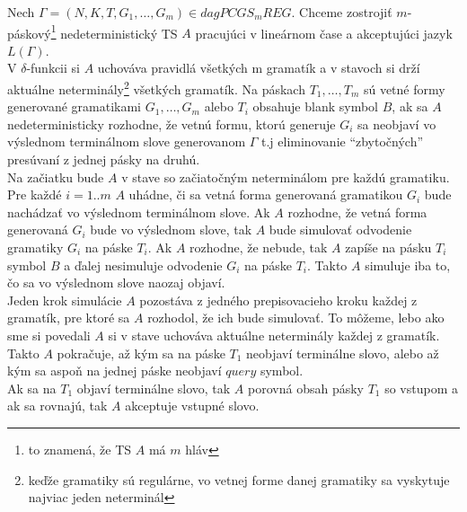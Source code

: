 \begin{dokaz}
  Nech $\Gamma=(N,K,T,G_1,\dots ,G_m)\in dagPCGS_mREG$. Chceme
  zostrojiť $m$-páskový\footnote{to znamená, že TS $A$ má $m$ hláv}
  nedeterministický TS $A$ pracujúci v lineárnom čase a akceptujúci
  jazyk $L(\Gamma)$.
  \\ V $\delta$-funkcii si $A$ uchováva pravidlá všetkých m gramatík
  a v stavoch si drží aktuálne neterminály\footnote{keďže gramatiky
  sú regulárne, vo vetnej forme danej gramatiky sa vyskytuje najviac
  jeden neterminál} všetkých gramatík. Na páskach $T_1,\dots ,T_m$
  sú vetné formy generované gramatikami $G_1,\dots ,G_m$ alebo $T_i$
  obsahuje blank symbol $B$, ak sa $A$ nedeterministicky rozhodne,
  že vetnú formu, ktorú generuje $G_i$ sa neobjaví vo výslednom
  terminálnom slove generovanom $\Gamma$ t.j eliminovanie
  \mbox{``zbytočných''} presúvaní z jednej pásky na druhú.
  \\ Na začiatku bude $A$ v stave so začiatočným neterminálom pre
  každú gramatiku. Pre každé $i=1..m$ $A$ uhádne, či sa vetná forma
  generovaná gramatikou $G_i$ bude nachádzať vo výslednom
  terminálnom slove. Ak $A$ rozhodne, že vetná forma generovaná
  $G_i$ bude vo výslednom slove, tak $A$ bude simulovať odvodenie
  gramatiky $G_i$ na páske $T_i$. Ak $A$ rozhodne, že nebude, tak
  $A$ zapíše na pásku $T_i$ symbol $B$ a ďalej nesimuluje odvodenie
  $G_i$ na páske $T_i$. Takto $A$ simuluje iba to, čo sa vo
  výslednom slove naozaj objaví.
  \\ Jeden krok simulácie $A$ pozostáva z jedného prepisovacieho kroku
  každej z gramatík, pre ktoré sa $A$ rozhodol, že ich bude
  simulovať. To môžeme, lebo ako sme si povedali $A$ si v stave
  uchováva aktuálne neterminály každej z gramatík. Takto $A$
  pokračuje, až kým sa na páske $T_1$ neobjaví terminálne slovo,
  alebo až kým sa aspoň na jednej páske neobjaví $query$ symbol. \\
  Ak sa na $T_1$ objaví terminálne slovo, tak $A$ porovná obsah
  pásky $T_1$ so vstupom a ak sa rovnajú, tak $A$ akceptuje vstupné
  slovo.


\end{dokaz}
